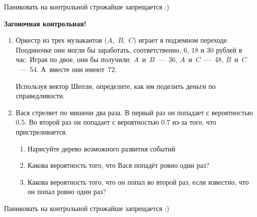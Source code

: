 \documentclass[pdftex,12pt,a4paper]{article}
\begin{document}
Паниковать на контрольной строжайше запрещается :)

\vspace{40pt}

\textbf{Загоночная контрольная!}

\begin{enumerate}


\item Оркестр из трех музыкантов ($A$,~$B$,~$C$) играет в подземном переходе. Поодиночке они
могли бы заработать, соответственно, $6$, $18$ и $30$
рублей в час. Играя по двое, они бы получили: $A$~и~$B$~---~36, $A$~и~$C$~---~48, $B$~и~$C$~---~54.
А~вместе они имеют~$72$.


Используя вектор Шепли, определите, как им поделить деньги по справедливости.

\item Вася стреляет по мишени два раза. В первый раз он попадает с вероятностью $0.5$. Во второй раз он попадает с вероятностью $0.7$ из-за того, что пристреливается. 
\begin{enumerate}
\item Нарисуйте дерево возможного развития событий
\item Какова вероятность того, что Вася попадёт ровно один раз?
\item Какова вероятность того, что он попал во второй раз, если известно, что он попал ровно один раз?
\end{enumerate}

\end{enumerate}

Паниковать на контрольной строжайше запрещается :)
\end{document}
